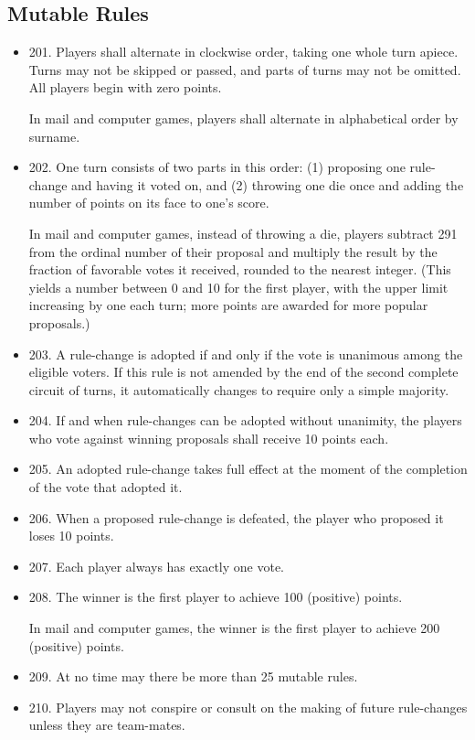 \documentclass[11pt]{article}
\begin{document}
\subsection{Mutable Rules}
\label{sec-1-2}

\begin{itemize}
\item 201. Players shall alternate in clockwise order, taking one whole
     turn apiece. Turns may not be skipped or passed, and parts of
     turns may not be omitted. All players begin with zero points.

     In mail and computer games, players shall alternate in
     alphabetical order by surname.
\item 202. One turn consists of two parts in this order: (1) proposing
     one rule-change and having it voted on, and (2) throwing one die
     once and adding the number of points on its face to one's score.

     In mail and computer games, instead of throwing a die, players
     subtract 291 from the ordinal number of their proposal and
     multiply the result by the fraction of favorable votes it
     received, rounded to the nearest integer. (This yields a number
     between 0 and 10 for the first player, with the upper limit
     increasing by one each turn; more points are awarded for more
     popular proposals.)
\item 203. A rule-change is adopted if and only if the vote is
     unanimous among the eligible voters. If this rule is not amended
     by the end of the second complete circuit of turns, it
     automatically changes to require only a simple majority.
\item 204. If and when rule-changes can be adopted without unanimity,
     the players who vote against winning proposals shall receive 10
     points each.
\item 205. An adopted rule-change takes full effect at the moment of
     the completion of the vote that adopted it.
\item 206. When a proposed rule-change is defeated, the player who
     proposed it loses 10 points.
\item 207. Each player always has exactly one vote.
\item 208. The winner is the first player to achieve 100 (positive)
     points.

     In mail and computer games, the winner is the first player to
     achieve 200 (positive) points.
\item 209. At no time may there be more than 25 mutable rules.
\item 210. Players may not conspire or consult on the making of future
     rule-changes unless they are team-mates.


\end{itemize}
\end{document}
